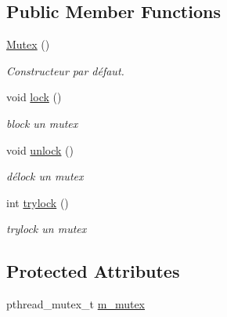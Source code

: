 \subsection*{Public Member Functions}
\begin{DoxyCompactItemize}
\item 
\hypertarget{classmognetwork_1_1_mutex_a281ab0e408b9a388586ee269881d3c26}{\hyperlink{classmognetwork_1_1_mutex_a281ab0e408b9a388586ee269881d3c26}{Mutex} ()}\label{classmognetwork_1_1_mutex_a281ab0e408b9a388586ee269881d3c26}

\begin{DoxyCompactList}\small\item\em Constructeur par défaut. \end{DoxyCompactList}\item 
\hypertarget{classmognetwork_1_1_mutex_a880c4341ad8d63c9bde15f4a60af2848}{void \hyperlink{classmognetwork_1_1_mutex_a880c4341ad8d63c9bde15f4a60af2848}{lock} ()}\label{classmognetwork_1_1_mutex_a880c4341ad8d63c9bde15f4a60af2848}

\begin{DoxyCompactList}\small\item\em block un mutex \end{DoxyCompactList}\item 
\hypertarget{classmognetwork_1_1_mutex_a9f3e0b542f8e9953eca9df6ae408083e}{void \hyperlink{classmognetwork_1_1_mutex_a9f3e0b542f8e9953eca9df6ae408083e}{unlock} ()}\label{classmognetwork_1_1_mutex_a9f3e0b542f8e9953eca9df6ae408083e}

\begin{DoxyCompactList}\small\item\em délock un mutex \end{DoxyCompactList}\item 
int \hyperlink{classmognetwork_1_1_mutex_ae4896f5c96a2088d6de667002c046dee}{trylock} ()
\begin{DoxyCompactList}\small\item\em trylock un mutex \end{DoxyCompactList}\end{DoxyCompactItemize}
\subsection*{Protected Attributes}
\begin{DoxyCompactItemize}
\item 
pthread\-\_\-mutex\-\_\-t \hyperlink{classmognetwork_1_1_mutex_a571d9d0b9b2be3da94192f34b6157ea9}{m\-\_\-mutex}
\end{DoxyCompactItemize}


